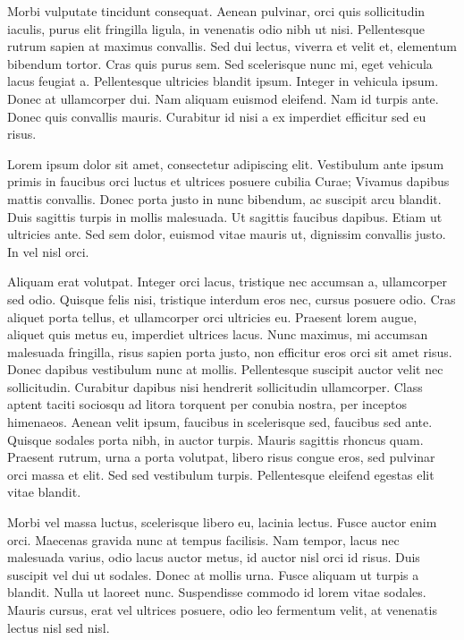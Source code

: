 \documentclass[a4paper,
	11pt,
	parskip=full,
	bibliography=totoc,
	twoside
	]{scrartcl}
\begin{document}
	Morbi vulputate tincidunt consequat. Aenean pulvinar, orci quis sollicitudin iaculis, purus elit fringilla ligula, in venenatis odio nibh ut nisi. Pellentesque rutrum sapien at maximus convallis. Sed dui lectus, viverra et velit et, elementum bibendum tortor. Cras quis purus sem. Sed scelerisque nunc mi, eget vehicula lacus feugiat a. Pellentesque ultricies blandit ipsum. Integer in vehicula ipsum. Donec at ullamcorper dui. Nam aliquam euismod eleifend. Nam id turpis ante. Donec quis convallis mauris. Curabitur id nisi a ex imperdiet efficitur sed eu risus.
	
	Lorem ipsum dolor sit amet, consectetur adipiscing elit. Vestibulum ante ipsum primis in faucibus orci luctus et ultrices posuere cubilia Curae; Vivamus dapibus mattis convallis. Donec porta justo in nunc bibendum, ac suscipit arcu blandit. Duis sagittis turpis in mollis malesuada. Ut sagittis faucibus dapibus. Etiam ut ultricies ante. Sed sem dolor, euismod vitae mauris ut, dignissim convallis justo. In vel nisl orci.
	
	Aliquam erat volutpat. Integer orci lacus, tristique nec accumsan a, ullamcorper sed odio. Quisque felis nisi, tristique interdum eros nec, cursus posuere odio. Cras aliquet porta tellus, et ullamcorper orci ultricies eu. Praesent lorem augue, aliquet quis metus eu, imperdiet ultrices lacus. Nunc maximus, mi accumsan malesuada fringilla, risus sapien porta justo, non efficitur eros orci sit amet risus. Donec dapibus vestibulum nunc at mollis. Pellentesque suscipit auctor velit nec sollicitudin. Curabitur dapibus nisi hendrerit sollicitudin ullamcorper. Class aptent taciti sociosqu ad litora torquent per conubia nostra, per inceptos himenaeos. Aenean velit ipsum, faucibus in scelerisque sed, faucibus sed ante. Quisque sodales porta nibh, in auctor turpis. Mauris sagittis rhoncus quam. Praesent rutrum, urna a porta volutpat, libero risus congue eros, sed pulvinar orci massa et elit. Sed sed vestibulum turpis. Pellentesque eleifend egestas elit vitae blandit.
	
	Morbi vel massa luctus, scelerisque libero eu, lacinia lectus. Fusce auctor enim orci. Maecenas gravida nunc at tempus facilisis. Nam tempor, lacus nec malesuada varius, odio lacus auctor metus, id auctor nisl orci id risus. Duis suscipit vel dui ut sodales. Donec at mollis urna. Fusce aliquam ut turpis a blandit. Nulla ut laoreet nunc. Suspendisse commodo id lorem vitae sodales. Mauris cursus, erat vel ultrices posuere, odio leo fermentum velit, at venenatis lectus nisl sed nisl.
	
\end{document}
